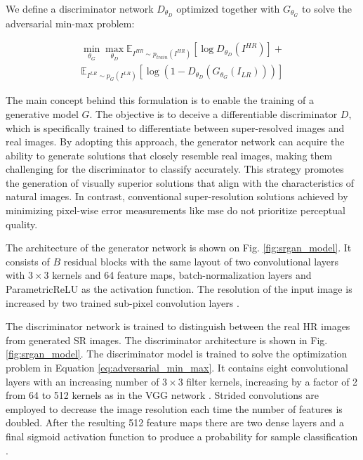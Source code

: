 \documentclass[conference]{IEEEtran}
\begin{document}
We define a discriminator network $D_{\theta_D}$ optimized together with $G_{\theta_G}$ to solve the adversarial min-max problem:

\begin{gather*} \label{eq:adversarial_min_max}
	\min_{\theta_G} \max_{\theta_D} \mathbb{E}_{I^{HR} \sim p_{train} (I^{HR}) }  [ \log D_{\theta_D}(I^{HR})  ] + \\
	\mathbb{E}_{I^{LR} \sim p_G (I^{LR})} [ \log (1 - D_{\theta_D} ( G_{\theta_G} (I_{LR}) )) ]
\end{gather*}

The main concept behind this formulation is to enable the training of a generative model $G$. The objective is to deceive a differentiable discriminator $D$, which is specifically trained to differentiate between super-resolved images and real images. By adopting this approach, the generator network can acquire the ability to generate solutions that closely resemble real images, making them challenging for the discriminator to classify accurately. This strategy promotes the generation of visually superior solutions that align with the characteristics of natural images. In contrast, conventional super-resolution solutions achieved by minimizing pixel-wise error measurements like \acrshort{mse} do not prioritize perceptual quality.

The architecture of the generator network is shown on Fig. \ref{fig:srgan_model}. It consists of $B$ residual blocks with the same layout of two convolutional layers with $3 \times 3$ kernels and 64 feature maps, batch-normalization layers and ParametricReLU \cite{delve_deep_into_rectifiers_2015} as the activation function. The resolution of the input image is increased by two trained sub-pixel convolution layers \cite{sub_pixel_cnn_2016}.

The discriminator network is trained to distinguish between the real HR images from generated SR images. The discriminator architecture is shown in Fig. \ref{fig:srgan_model}. The discriminator model is trained to solve the optimization problem in Equation \ref{eq:adversarial_min_max}. It contains eight convolutional layers with an increasing number of $3 \times 3$ filter kernels, increasing by a factor of 2 from 64 to 512 kernels as in the VGG network \cite{vgg_very_deep_cnn_2014}. Strided convolutions are employed to decrease the image resolution each time the number of features is doubled. After the resulting 512 feature maps there are two dense layers and a final sigmoid activation function to produce a probability for sample classification \cite{srgan_2016}.
\end{document}
